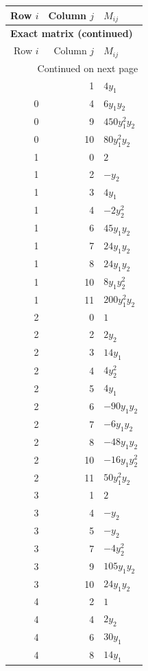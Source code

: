 \documentclass[10pt,a4paper]{article}
\begin{document}
{\small\setlength{\tabcolsep}{7pt}\begin{longtable}{rrp{125mm}}
\toprule Row $i$ & Column $j$ & $M_{ij}$\\\midrule\endfirsthead
\multicolumn{3}{l}{\textbf{Exact matrix (continued)}}\\
\toprule Row $i$ & Column $j$ & $M_{ij}$\\\midrule\endhead
\midrule\multicolumn{3}{r}{Continued on next page}\\\endfoot\bottomrule\endlastfoot
0 & 1 & $4 y_{1}$\\
0 & 4 & $6 y_{1} y_{2}$\\
0 & 9 & $450 y_{1}^{2} y_{2}$\\
0 & 10 & $80 y_{1}^{2} y_{2}$\\
1 & 0 & $2$\\
1 & 2 & $- y_{2}$\\
1 & 3 & $4 y_{1}$\\
1 & 4 & $- 2 y_{2}^{2}$\\
1 & 6 & $45 y_{1} y_{2}$\\
1 & 7 & $24 y_{1} y_{2}$\\
1 & 8 & $24 y_{1} y_{2}$\\
1 & 10 & $8 y_{1} y_{2}^{2}$\\
1 & 11 & $200 y_{1}^{2} y_{2}$\\
2 & 0 & $1$\\
2 & 2 & $2 y_{2}$\\
2 & 3 & $14 y_{1}$\\
2 & 4 & $4 y_{2}^{2}$\\
2 & 5 & $4 y_{1}$\\
2 & 6 & $- 90 y_{1} y_{2}$\\
2 & 7 & $- 6 y_{1} y_{2}$\\
2 & 8 & $- 48 y_{1} y_{2}$\\
2 & 10 & $- 16 y_{1} y_{2}^{2}$\\
2 & 11 & $50 y_{1}^{2} y_{2}$\\
3 & 1 & $2$\\
3 & 4 & $- y_{2}$\\
3 & 5 & $- y_{2}$\\
3 & 7 & $- 4 y_{2}^{2}$\\
3 & 9 & $105 y_{1} y_{2}$\\
3 & 10 & $24 y_{1} y_{2}$\\
4 & 2 & $1$\\
4 & 4 & $2 y_{2}$\\
4 & 6 & $30 y_{1}$\\
4 & 8 & $14 y_{1}$\\

\end{longtable}}
\end{document}
